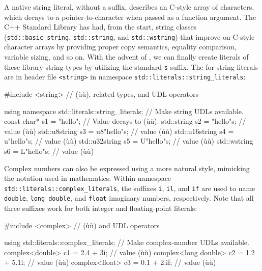 A native string literal, without a suffix, describes an C-style array of
characters, which decays to a pointer-to-character when passed as a
function argument. The C++ Standard Library has had, from the start,
string classes (\lstinline!std::basic_string!, \lstinline!std::string!, and
\lstinline!std::wstring!) that improve on C-style character arrays by
providing proper copy semantics, equality comparison, variable sizing,
and so on. With the advent of , we can finally create
literals of these library string types by utilizing the standard
\lstinline!s! suffix. The  for string literals are in
header file \lstinline!<string>! in namespace\linebreak%
\lstinline!std::literals::string_literals!:

\begin{emcppslisting}
#include <string>  // (ù{}ù), related types, and UDL operators

using namespace std::literals::string_literals;  // Make string UDLs available.
const char*    s1 =   "hello";    // Value decays to (ù{}ù).
std::string    s2 =   "hello"s;   // value (ù{}ù)
std::u8string  s3 = u8"hello"s;   // value (ù{}ù)
std::u16string s4 =  u"hello"s;   // value (ù{}ù)
std::u32string s5 =  U"hello"s;   // value (ù{}ù)
std::wstring   s6 =  L"hello"s;   // value (ù{}ù)
\end{emcppslisting}
    
\noindent Complex numbers can also be expressed using a more natural style,
mimicking the notation used in mathematics. Within namespace
\lstinline!std::literals::complex_literals!, the suffixes \lstinline!i!,
\lstinline!il!, and \lstinline!if! are used to name \lstinline!double!,
\lstinline!long!~\lstinline!double!, and \lstinline!float! imaginary numbers,
respectively. Note that all three suffixes work for both integer and
floating-point literals:

\begin{emcppslisting}
#include <complex>  // (ù{}ù) and UDL operators

using std::literals::complex_literals; // Make complex-number UDLs available.
complex<double>      c1 = 2.4 + 3i;    // value (ù{}ù)
complex<long double> c2 = 1.2 + 5.1l;  // value (ù{}ù)
complex<float>       c3 = 0.1 + 2.if;  // value (ù{}ù)
\end{emcppslisting}
    
